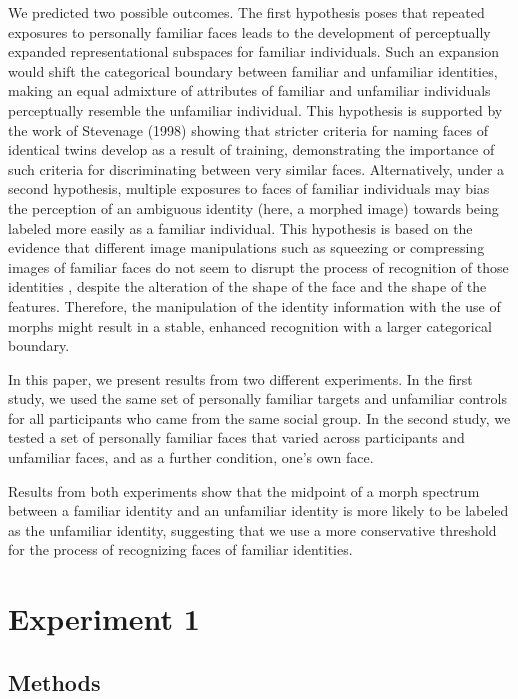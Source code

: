 \documentclass[10pt,letterpaper]{article}
\begin{document}
We predicted two possible outcomes. The first hypothesis poses that repeated exposures to personally familiar faces leads to the development of perceptually expanded representational subspaces for familiar individuals. Such an expansion would shift the categorical boundary between familiar and unfamiliar identities, making an equal admixture of attributes of familiar and unfamiliar individuals perceptually resemble the unfamiliar individual. This hypothesis is supported by the work of Stevenage (1998)\cite{stevenage1998twin} showing that stricter criteria for naming faces of identical twins develop as a result of training, demonstrating the importance of such criteria for discriminating between very similar faces. Alternatively, under a second hypothesis, multiple exposures to faces of familiar individuals may bias the perception of an ambiguous identity (here, a morphed image) towards being labeled more easily as a familiar individual. This hypothesis is based on the evidence that different image manipulations such as squeezing or compressing images of familiar faces do not seem to disrupt the process of recognition of those identities \cite{sinha2006face, gilad2018recognizing}, despite the alteration of the shape of the face and the shape of the features. Therefore, the manipulation of the identity information with the use of morphs might result in a stable, enhanced recognition with a larger categorical boundary. 

In this paper, we present results from two different experiments. In the first study, we used the same set of personally familiar targets and unfamiliar controls for all participants who came from the same social group. In the second study, we tested a set of personally familiar faces that varied across participants and unfamiliar faces, and as a further condition, one’s own face. 

Results from both experiments show that the midpoint of a morph spectrum between a familiar identity and an unfamiliar identity is more likely to be labeled as the unfamiliar identity, suggesting that we use a more conservative threshold for the process of recognizing faces of familiar identities. 


\section*{Experiment 1}

\subsection*{Methods}
\end{document}
